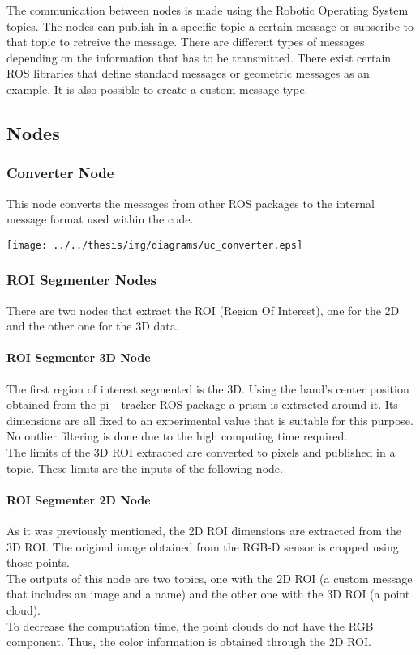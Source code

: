 \documentclass{article}
\begin{document}
The communication between nodes is made using the Robotic Operating System topics. The nodes can publish in a specific topic a certain message or subscribe to that topic to retreive the message. 
There are different types of messages depending on the information that has to be transmitted. There exist certain ROS libraries that define standard messages or geometric messages as an example. It is also possible to create a custom message type. 


\subsection{Nodes}

\subsubsection{Converter Node}

This node converts the messages from other ROS packages to the internal message format used within the code. 

\begin{center}
	\texttt{[image: ../../thesis/img/diagrams/uc\_converter.eps]}
\end{center}
	
\subsubsection{ROI Segmenter Nodes}
There are two nodes that extract the ROI (Region Of Interest), one for the 2D and the other one for the 3D data.

\paragraph {ROI Segmenter 3D Node\\[0.5cm]}

The first region of interest segmented is the 3D. Using the hand's center position obtained from the pi\_ tracker ROS package a prism is extracted around it. Its dimensions are all fixed to an experimental value that is suitable for this purpose. 
\\
No outlier filtering is done due to the high computing time required.  
\\
The limits of the 3D ROI extracted are converted to pixels and published in a topic. These limits are the inputs of the following node. 

\paragraph{ROI Segmenter 2D Node\\[0.5cm]}
As it was previously mentioned, the 2D ROI dimensions are extracted from the 3D ROI. The original image obtained from the RGB-D sensor is cropped using those points. 
\\
The outputs of this node are two topics, one with the 2D ROI (a custom message that includes an image and a name) and the other one with the 3D ROI (a point cloud).
\\
To decrease the computation time, the point clouds do not have the RGB component. Thus, the color information is obtained through the 2D ROI. 
\end{document}
